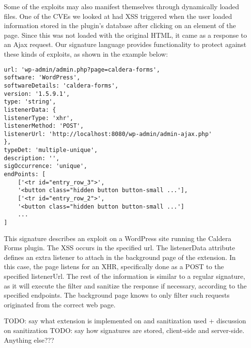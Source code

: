 Some of the exploits may also manifest themselves through dynamically loaded files. One of the CVEs we looked at had XSS triggered when the user loaded information stored in the plugin's database after clicking on an element of the page. Since this was not loaded with the original HTML, it came as a response to an Ajax request. Our signature language provides functionality to protect against these kinds of exploits, as shown in the example below:

 \lstset{basicstyle=\small}
\begin{lstlisting}
url: 'wp-admin/admin.php?page=caldera-forms',
software: 'WordPress',
softwareDetails: 'caldera-forms',
version: '1.5.9.1',
type: 'string',
listenerData: {
listenerType: 'xhr',
listenerMethod: 'POST',
listenerUrl: 'http://localhost:8080/wp-admin/admin-ajax.php'
},
typeDet: 'multiple-unique',
description: '',
sigOccurrence: 'unique',
endPoints: [
	['<tr id="entry_row_3">', 
	'<button class="hidden button button-small ...'],
	['<tr id="entry_row_2">', 
	'<button class="hidden button button-small ...']
	...
]
\end{lstlisting}

This signature describes an exploit on a WordPress site running the Caldera Forms plugin. The XSS occurs in the specified url. The listenerData attribute defines an extra listener to attach in the background page of the extension. In this case, the page listens for an XHR, specifically done as a POST to the specified listenerUrl. The rest of the information is similar to a regular signature, as it will execute the filter and sanitize the response if necessary, according to the specified endpoints. The background page knows to only filter such requests originated from the correct web page.

TODO: say what extension is implemented on and sanitization used + discussion on sanitization
TODO: say how signatures are stored, client-side and server-side.
Anything else???